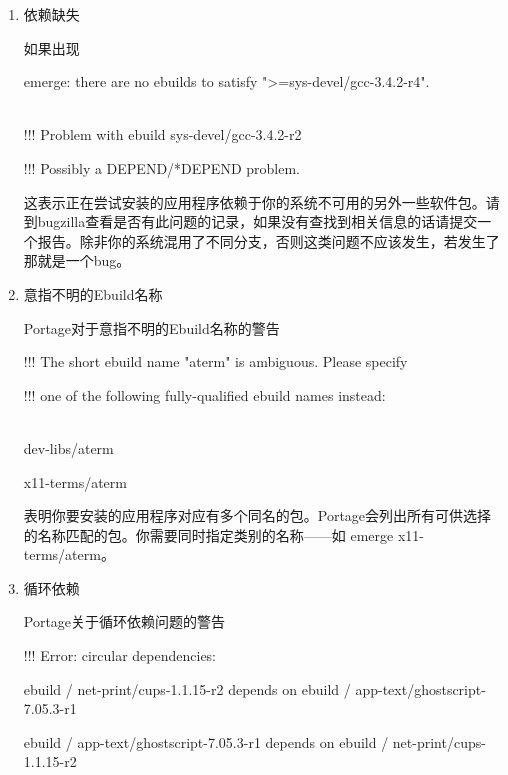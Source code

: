 \begin{enumerate}
\item 依赖缺失

如果出现

\begin{code}
emerge: there are no ebuilds to satisfy ">=sys-devel/gcc-3.4.2-r4".

\qquad\\

!!! Problem with ebuild sys-devel/gcc-3.4.2-r2

!!! Possibly a DEPEND/*DEPEND problem. 

\end{code}

这表示正在尝试安装的应用程序依赖于你的系统不可用的另外一些软件包。请到bugzilla查看是否有此问题的记录，如果没有查找到相关信息的话请提交一个报告。除非你的系统混用了不同分支，否则这类问题不应该发生，若发生了那就是一个bug。

\item 意指不明的Ebuild名称

\begin{example}{Portage对于意指不明的Ebuild名称的警告}
\begin{code}
!!! The short ebuild name "aterm" is ambiguous.  Please specify

!!! one of the following fully-qualified ebuild names instead:

 \\

    dev-libs/aterm

    x11-terms/aterm

\end{code}

\end{example}

表明你要安装的应用程序对应有多个同名的包。Portage会列出所有可供选择的名称匹配的包。你需要同时指定类别的名称——如 emerge x11-terms/aterm。


\item 循环依赖

\begin{example}{Portage关于循环依赖问题的警告}
\begin{code}
!!! Error: circular dependencies: 

ebuild / net-print/cups-1.1.15-r2 depends on ebuild / app-text/ghostscript-7.05.3-r1

ebuild / app-text/ghostscript-7.05.3-r1 depends on ebuild / net-print/cups-1.1.15-r2 
\end{code}
\end{example}


\end{enumerate}
